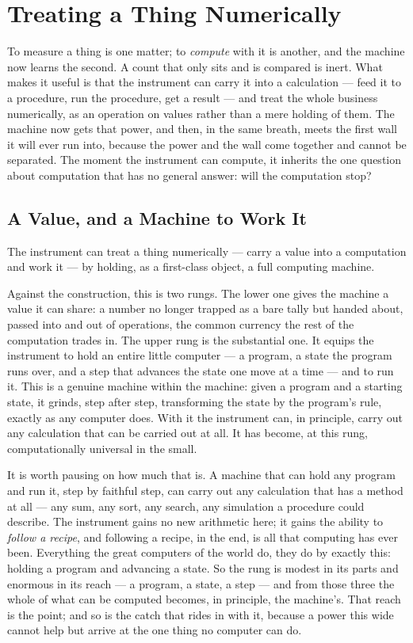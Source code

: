 \chapter{Treating a Thing Numerically}

To measure a thing is one matter; to \emph{compute} with it is another, and the machine now learns the second. A
count that only sits and is compared is inert. What makes it useful is that the instrument can carry it into a
calculation --- feed it to a procedure, run the procedure, get a result --- and treat the whole business
numerically, as an operation on values rather than a mere holding of them. The machine now gets that power, and
then, in the same breath, meets the first wall it will ever run into, because the power and the wall come
together and cannot be separated. The moment the instrument can compute, it inherits the one
question about computation that has no general answer: will the computation stop?

\section{A Value, and a Machine to Work It}

The instrument can treat a thing numerically --- carry a value into a computation and work it --- by holding, as
a first-class object, a full computing machine.

Against the construction, this is two rungs. The lower one gives the machine a value it can share: a number no
longer trapped as a bare tally but handed about, passed into and out of operations, the common currency the rest
of the computation trades in. The upper rung is the substantial one. It equips the instrument to hold an entire
little computer --- a program, a state the program runs over, and a step that advances the state one move at a
time --- and to run it. This is a genuine machine within the machine: given a program and a starting state, it
grinds, step after step, transforming the state by the program's rule, exactly as any computer does. With it the
instrument can, in principle, carry out any calculation that can be carried out at all. It has become, at this
rung, computationally universal in the small.

It is worth pausing on how much that is. A machine that can hold any program and run it, step by faithful step,
can carry out any calculation that has a method at all --- any sum, any sort, any search, any simulation a
procedure could describe. The instrument gains no new arithmetic here; it gains the ability to \emph{follow a
recipe}, and following a recipe, in the end, is all that computing has ever been. Everything the great computers
of the world do, they do by exactly this: holding a program and advancing a state. So the rung is modest in its
parts and enormous in its reach --- a program, a state, a step --- and from those three the whole of what can be
computed becomes, in principle, the machine's. That reach is the point; and so is the catch that rides in with
it, because a power this wide cannot help but arrive at the one thing no computer can do.

